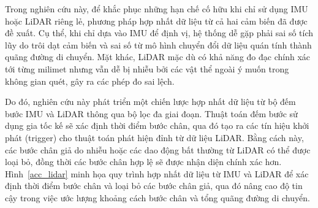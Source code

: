 Trong nghiên cứu này, để khắc phục những hạn chế cố hữu khi chỉ sử dụng IMU hoặc LiDAR riêng lẻ, phương pháp hợp nhất dữ liệu từ cả hai cảm biến đã được đề xuất. Cụ thể, khi chỉ dựa vào IMU để định vị, hệ thống dễ gặp phải sai số tích lũy do trôi dạt cảm biến và sai số từ mô hình chuyển đổi dữ liệu quán tính thành quãng đường di chuyển. Mặt khác, LiDAR mặc dù có khả năng đo đạc chính xác tới từng milimet nhưng vẫn dễ bị nhiễu bởi các vật thể ngoài ý muốn trong không gian quét, gây ra các phép đo sai lệch.

Do đó, nghiên cứu này phát triển một chiến lược hợp nhất dữ liệu từ bộ đếm bước IMU và LiDAR thông qua bộ lọc đa giai đoạn. Thuật toán đếm bước sử dụng gia tốc kế sẽ xác định thời điểm bước chân, qua đó tạo ra các tín hiệu khởi phát (trigger) cho thuật toán phát hiện đỉnh từ dữ liệu LiDAR. Bằng cách này, các bước chân giả do nhiễu hoặc các dao động bất thường từ LiDAR có thể được loại bỏ, đồng thời các bước chân hợp lệ sẽ được nhận diện chính xác hơn. Hình~\ref{acc_lidar} minh họa quy trình hợp nhất dữ liệu từ IMU và LiDAR để xác định thời điểm bước chân và loại bỏ các bước chân giả, qua đó nâng cao độ tin cậy trong việc ước lượng khoảng cách bước chân và tổng quãng đường di chuyển.